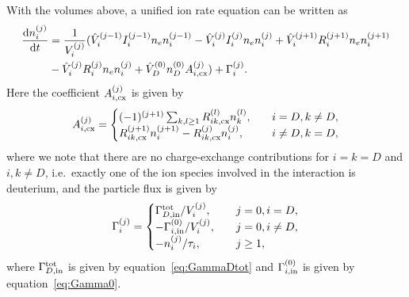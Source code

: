 \documentclass{notes}
\begin{document}
    With the volumes above, a unified ion rate equation can be written as
    \begin{equation}
        \begin{aligned}
            \frac{\mathrm{d} n_i^{(j)}}{\mathrm{d} t} &=
                \frac{1}{V_i^{(j)}}(\hat{V}_i^{(j-1)}
                    I_i^{(j-1)}n_en_i^{(j-1)}
                    -\hat{V}_i^{(j)}I_i^{(j)}n_en_i^{(j)}
                    + \hat{V}_i^{(j+1)}R_i^{(j+1)}n_en_i^{(j+1)} \\
                    &-\hat{V}_i^{(j)}R_i^{(j)}n_en_i^{(j)} 
                	+ \hat{V}_D^{(0)}n_D^{(0)}A_{i,{\rm cx}}^{(j)} ) 
                +\Gamma_i^{(j)}.
        \end{aligned}
    \end{equation}
    Here the coefficient $A_{i,{\rm cx}}^{(j)}$ is given by
    \begin{equation}
    	A_{i,{\rm cx}}^{(j)} = \begin{cases}
    	(-1)^{(j+1)}\sum_{k,l\geq 1}R_{ik,{\rm cx}}^{(l)}n_k^{(l)}, &\quad i=D, k\neq D,\\
    	R_{ik,{\rm cx}}^{(j+1)}n_i^{(j+1)}
                    -R_{ik,{\rm cx}}^{(j)}n_i^{(j)}, &\quad i\neq D, k=D,
    	\end{cases}
    \end{equation}
    where we note that there are no charge-exchange contributions for $i=k=D$ and $i,k\neq D$, i.e.\ exactly one of the ion species involved in the interaction is deuterium, and the particle flux is given by
    \begin{equation}
        \Gamma_i^{(j)} = \begin{cases}
            \Gamma_{D,{\rm in}}^{\rm tot}/V_i^{(j)}, &\quad j=0, i=D,\\
            -\Gamma_{i,{\rm in}}^{(0)}/V_i^{(j)}, &\quad j=0, i\neq D,\\
            -n_i^{(j)}/\tau_i, &\quad j\geq 1, 
        \end{cases}
    \end{equation}
    where $\Gamma_{D,{\rm in}}^{\rm tot}$ is given by equation~\eqref{eq:GammaDtot} and $\Gamma_{i,{\rm in}}^{(0)}$ is given by equation~\eqref{eq:Gamma0}.
\end{document}
